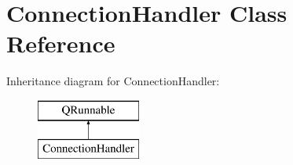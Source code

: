 \hypertarget{class_connection_handler}{\section{Connection\+Handler Class Reference}
\label{class_connection_handler}
}
Inheritance diagram for Connection\+Handler\+:\begin{figure}[H]
\begin{center}
\leavevmode
\includegraphics[height=2.000000cm]{class_connection_handler}
\end{center}
\end{figure}
